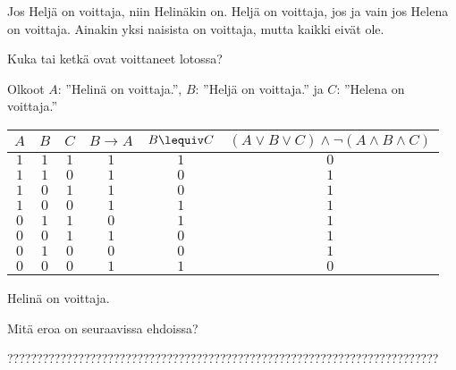 \begin{kotitehtavasivu}
\begin{tehtava}
Jos Heljä on voittaja, niin Helinäkin on. 
Heljä on voittaja, jos ja vain jos Helena on voittaja.
Ainakin yksi naisista on voittaja, mutta kaikki eivät ole.

Kuka tai ketkä ovat voittaneet lotossa?

    \begin{vastaus}
    
        Olkoot $A$: ''Helinä on voittaja.'', $B$: ''Heljä on voittaja.'' ja $C$: ''Helena on voittaja.''
        \begin{center}
		    \begin{tabular}{|c|c|c|c|c|c|}\hline
		    $A$ & $B$ & $C$ & $B\to A$ & $B\lequiv C$ & $(A\lor B\lor C)\land \lnot(A\land B\land C)$ \\ \hline
		    $1$ & $1$ & $1$ & $1$ & $1$ & $0$ \\ %
		    $1$ & $1$ & $0$ & $1$ & $0$ & $1$ \\
		    $1$ & $0$ & $1$ & $1$ & $0$ & $1$ \\
		    $1$ & $0$ & $0$ & $1$ & $1$ & $1$ \\
		    $0$ & $1$ & $1$ & $0$ & $1$ & $1$ \\
		    $0$ & $0$ & $1$ & $1$ & $0$ & $1$ \\
		    $0$ & $1$ & $0$ & $0$ & $0$ & $1$ \\
		    $0$ & $0$ & $0$ & $1$ & $1$ & $0$ \\ \hline
\end{tabular}
\end{center}
Helinä on voittaja.
    \end{vastaus}
    
\end{tehtava}

\begin{tehtava}
     Mitä eroa on seuraavissa ehdoissa?
    \begin{alakohdat}
    \end{alakohdat}

    \begin{vastaus}
    
       ????????????????????????????????????????????????????????????????????????? %
    \end{vastaus}
    

\end{tehtava}
\end{kotitehtavasivu}
